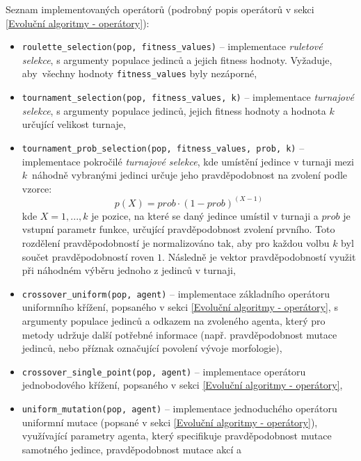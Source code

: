 Seznam implementovaných operátorů (podrobný popis operátorů v sekci
\ref{Evoluční algoritmy - operátory}):
\begin{itemize}
    \item \texttt{roulette\_selection(pop, fitness\_values)} -- implementace
        \emph{ruletové selekce}, s argumenty populace jedinců a jejich fitness
        hodnoty. Vyžaduje, aby~všechny hodnoty \texttt{fitness\_values} byly
        nezáporné,
    \item \texttt{tournament\_selection(pop, fitness\_values, k)} --
        implementace \emph{turnajové selekce}, s argumenty populace jedinců,
        jejich fitness hodnoty a hodnota $k$ určující velikost turnaje,
    \item \texttt{tournament\_prob\_selection(pop, fitness\_values, prob, k)}
        -- implementace pokročilé \emph{turnajové selekce}, kde umístění
        jedince v turnaji mezi $k$~náhodně vybranými jedinci určuje jeho
        pravděpodobnost na zvolení podle vzorce: 
        \begin{equation}
            p(X) = prob\cdot(1-prob)^{(X-1)}
        \end{equation}
        kde $X=1,...,k$ je pozice, na které se daný jedince umístil v turnaji a
        $prob$ je vstupní parametr funkce, určující pravděpodobnost zvolení
        prvního. Toto rozdělení pravděpodobností je normalizováno tak, aby pro
        každou volbu $k$ byl součet pravděpodobností roven $1$. Následně je
        vektor pravděpodobností využit při náhodném výběru jednoho z jedinců v
        turnaji, 
    \item \texttt{crossover\_uniform(pop, agent)} -- implementace základního
        operátoru uniformního křížení, popsaného v sekci \ref{Evoluční
        algoritmy - operátory}, s argumenty populace jedinců a odkazem na
        zvoleného agenta, který pro metody udržuje další potřebné informace
        (např. pravděpodobnost mutace jedinců, nebo příznak označující povolení
        vývoje morfologie),
    \item \texttt{crossover\_single\_point(pop, agent)} -- implementace
        operátoru jednobodového křížení, popsaného v sekci \ref{Evoluční
        algoritmy - operátory},
    \item \texttt{uniform\_mutation(pop, agent)} -- implementace jednoduchého
        operátoru uniformní mutace (popsané v sekci \ref{Evoluční algoritmy -
        operátory}), využívající parametry agenta, který specifikuje
        pravděpodobnost mutace samotného jedince, pravděpodobnost mutace akcí a

\end{itemize}
